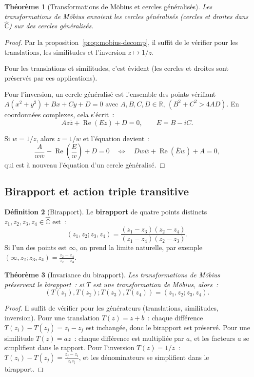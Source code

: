 \documentclass[12pt,a4paper,openany]{book}
\theoremstyle{definition}
\newtheorem{definition}{Définition}[chapter]
\theoremstyle{plain}
\newtheorem{theoreme}[definition]{Théorème}
\theoremstyle{remark}
\newcommand{\C}{\mathbb{C}}
\newcommand{\R}{\mathbb{R}}
\DeclareMathOperator{\re}{Re}
\newcommand{\conj}[1]{\overline{#1}}
\begin{document}
\begin{theoreme}[Transformations de Möbius et cercles généralisés]\label{thm:mobius-cercles}
Les transformations de Möbius envoient les cercles généralisés (cercles et droites
dans $\widehat{\C}$) sur des cercles généralisés.
\end{theoreme}

\begin{proof}
Par la proposition~\ref{prop:mobius-decomp}, il suffit de le vérifier pour les
translations, les similitudes et l'inversion $z \mapsto 1/z$.

Pour les translations et similitudes, c'est évident (les cercles et droites sont
préservés par ces applications).

Pour l'inversion, un cercle généralisé est l'ensemble des points vérifiant
$A(x^2+y^2) + Bx + Cy + D = 0$ avec $A, B, C, D \in \R$, $(B^2+C^2 > 4AD)$.
En coordonnées complexes, cela s'écrit~:
\[
  A z\conj{z} + \re(Ez) + D = 0, \qquad E = B - iC.
\]

Si $w = 1/z$, alors $z = 1/w$ et l'équation devient~:
\[
  \frac{A}{w\conj{w}} + \re\!\left(\frac{E}{w}\right) + D = 0
  \quad \Longleftrightarrow \quad
  D w\conj{w} + \re(\conj{E}w) + A = 0,
\]
qui est à nouveau l'équation d'un cercle généralisé.
\end{proof}

\subsection{Birapport et action triple transitive}

\begin{definition}[Birapport]\label{def:birapport}
Le \textbf{birapport} de quatre points distincts $z_1, z_2, z_3, z_4 \in \widehat{\C}$
est~:
\[
  (z_1, z_2; z_3, z_4) = \frac{(z_1 - z_3)(z_2 - z_4)}{(z_1 - z_4)(z_2 - z_3)}.
\]
Si l'un des points est $\infty$, on prend la limite naturelle, par exemple
$(\infty, z_2; z_3, z_4) = \frac{z_2 - z_4}{z_2 - z_3}$.
\end{definition}

\begin{theoreme}[Invariance du birapport]\label{thm:birapport-invariant}
Les transformations de Möbius préservent le birapport~: si $T$ est une
transformation de Möbius, alors~:
\[
  (T(z_1), T(z_2); T(z_3), T(z_4)) = (z_1, z_2; z_3, z_4).
\]
\end{theoreme}

\begin{proof}
Il suffit de vérifier pour les générateurs (translations, similitudes, inversion).
Pour une translation $T(z) = z + b$~: chaque différence $T(z_i) - T(z_j) = z_i - z_j$
est inchangée, donc le birapport est préservé.
Pour une similitude $T(z) = az$~: chaque différence est multipliée par $a$, et
les facteurs $a$ se simplifient dans le rapport.
Pour l'inversion $T(z) = 1/z$~:
$T(z_i) - T(z_j) = \frac{z_j - z_i}{z_i z_j}$, et les dénominateurs se simplifient
dans le birapport.
\end{proof}
\end{document}
